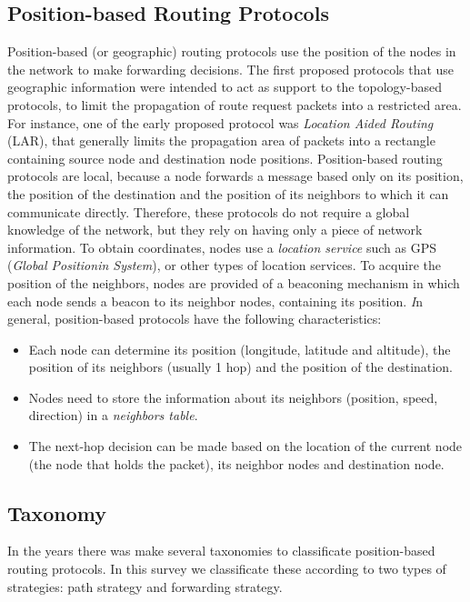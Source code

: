 \documentclass[journal,comsoc]{IEEEtran}
\begin{document}
\subsection{Position-based Routing Protocols}
Position-based (or geographic) routing protocols use the position of the nodes in the network to make forwarding decisions. The first proposed protocols that use geographic information were intended to act as support to the topology-based protocols, to limit the propagation of route request packets into a restricted area. For instance, one of the early proposed protocol was \emph{Location Aided Routing} (LAR), that generally limits the propagation area of packets into a rectangle containing source node and destination node positions. Position-based routing protocols are local, because a node forwards a message based only on its position, the position of the destination and the position of its neighbors to which it can communicate directly. Therefore, these protocols do not require a global knowledge of the network, but they rely on having only a piece of network information. To obtain coordinates, nodes use a \emph{location service} such as GPS (\emph{Global Positionin System}), or other types of location services. To acquire the position of the neighbors, nodes are provided of a beaconing mechanism in which each node sends a beacon to its neighbor nodes, containing its position.
\emph In general, position-based protocols have the following characteristics:
\begin{itemize}
\item Each node can determine its position (longitude, latitude and altitude), the position of its neighbors (usually 1 hop) and the position of the destination.
\item Nodes need to store the information about its neighbors (position, speed, direction) in a \emph{neighbors table}.
\item The next-hop decision can be made based on the location of the current node (the node that holds the packet), its neighbor nodes and destination node.
\end{itemize}

\subsection{Taxonomy}
In the years there was make several taxonomies to classificate position-based routing protocols. In this survey we classificate these according to two types of strategies: path strategy and forwarding strategy.
\end{document}
